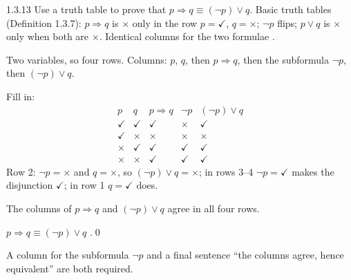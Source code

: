 \begin{bookex}[essential]{1.3.13}
Use a truth table to prove that $p\Rightarrow q\equiv(\neg p)\vee q$.
\solution
\given Basic truth tables (Definition 1.3.7): $p\Rightarrow q$ is $\times$ only in the row $p=\checkmark$, $q=\times$; $\neg p$ flips; $p\vee q$ is $\times$ only when both are $\times$.
\goal Identical columns for the two formulae .
\begin{steps}
\item Two variables, so four rows. Columns: $p$, $q$, then $p\Rightarrow q$, then the subformula $\neg p$, then $(\neg p)\vee q$.
\item Fill in:
\[
\begin{array}{cc|c|cc}
p&q&p\Rightarrow q&\neg p&(\neg p)\vee q\\\hline
\checkmark&\checkmark&\checkmark&\times&\checkmark\\
\checkmark&\times&\times&\times&\times\\
\times&\checkmark&\checkmark&\checkmark&\checkmark\\
\times&\times&\checkmark&\checkmark&\checkmark
\end{array}
\]
Row 2: $\neg p=\times$ and $q=\times$, so $(\neg p)\vee q=\times$; in rows 3--4 $\neg p=\checkmark$ makes the disjunction $\checkmark$; in row 1 $q=\checkmark$ does.
\item The columns of $p\Rightarrow q$ and $(\neg p)\vee q$ agree in all four rows.
\end{steps}
\conclusion $p\Rightarrow q\equiv(\neg p)\vee q$ .\qed
\begin{compare}
\item A column for the subformula $\neg p$ and a final sentence ``the columns agree, hence equivalent'' are both required.
\end{compare}
\end{bookex}

